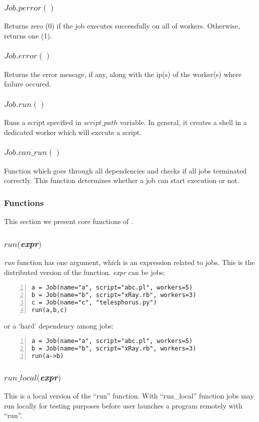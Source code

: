\subsubsection*{$Job.perror()$}
Returns zero (0) if the job executes successfully on all of workers. Otherwise, returns one (1).
\subsubsection*{$Job.error()$}
Returns the error message, if any, along with the ip(s) of the worker(s) where failure occured.
\subsubsection*{$Job.run()$}
Runs a script specified in $script\_path$ variable. In general, it creates a shell in a dedicated worker which will execute a script.
\subsubsection*{$Job.can\_run()$}
Function which goes through all dependencies and checks if all jobs terminated correctly. This function determines whether
a job can start execution or not.

\subsubsection*{\lang{} Functions}

This section we present core functions of \lang{}.
\subsubsection*{$run($\textit{expr}$)$}
\textit{run} function has one argument, which is an expression related to jobs.
This is the distributed version of the function.
\textit{expr} can be jobs:
\begin{Verbatim}[numbers=left]
a = Job(name="a", script="abc.pl", workers=5)
b = Job(name="b", script="xRay.rb", workers=3)
c = Job(name="c", "telesphorus.py")
run(a,b,c)
\end{Verbatim}
or a `hard' dependency among jobs:
\begin{Verbatim}[numbers=left]
a = Job(name="a", script="abc.pl", workers=5)
b = Job(name="b", script="xRay.rb", workers=3)
run(a->b)
\end{Verbatim}
\subsubsection*{$run\_local($\textit{expr}$)$}
This is a local version of the ``run'' function. With ``run\_local'' function jobs may run locally for testing purposes before user launches a program remotely with ``run''.
